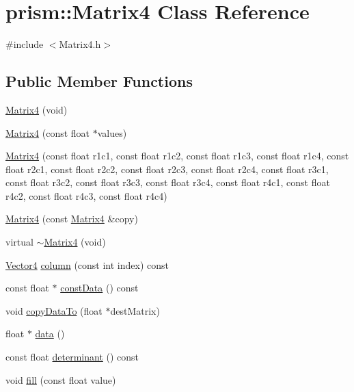 \hypertarget{classprism_1_1_matrix4}{}\section{prism\+:\+:Matrix4 Class Reference}
\label{classprism_1_1_matrix4}


{\ttfamily \#include $<$Matrix4.\+h$>$}

\subsection*{Public Member Functions}
\begin{DoxyCompactItemize}
\item 
\hyperlink{classprism_1_1_matrix4_a9db27bce505b827ee46568fb105ff563}{Matrix4} (void)
\item 
\hyperlink{classprism_1_1_matrix4_a442f58d6a24413f1e2cb7cf6150c5fb9}{Matrix4} (const float $\ast$values)
\item 
\hyperlink{classprism_1_1_matrix4_a6e19410eb6de5dfdaeb989d3042176a1}{Matrix4} (const float r1c1, const float r1c2, const float r1c3, const float r1c4, const float r2c1, const float r2c2, const float r2c3, const float r2c4, const float r3c1, const float r3c2, const float r3c3, const float r3c4, const float r4c1, const float r4c2, const float r4c3, const float r4c4)
\item 
\hyperlink{classprism_1_1_matrix4_a1112c0939a2dc4112d0552cafd37dff0}{Matrix4} (const \hyperlink{classprism_1_1_matrix4}{Matrix4} \&copy)
\item 
virtual \hyperlink{classprism_1_1_matrix4_aa2117a89fa9caa8dc2b412edca5e0dd5}{$\sim$\+Matrix4} (void)
\item 
\hyperlink{classprism_1_1_vector4}{Vector4} \hyperlink{classprism_1_1_matrix4_ab7eaeaa15cc37f55e745ea864965e7ab}{column} (const int index) const 
\item 
const float $\ast$ \hyperlink{classprism_1_1_matrix4_a69244d86a13dce29f8f0a55f236b38fb}{const\+Data} () const 
\item 
void \hyperlink{classprism_1_1_matrix4_a03e5bcf5cf9a158588c375ed2e926cfd}{copy\+Data\+To} (float $\ast$dest\+Matrix)
\item 
float $\ast$ \hyperlink{classprism_1_1_matrix4_a44d98ab79e84733585994391561e2bec}{data} ()
\item 
const float \hyperlink{classprism_1_1_matrix4_adafd95c93e903c7d5971c860257e0921}{determinant} () const 
\item 
void \hyperlink{classprism_1_1_matrix4_a250d014842d71975bdfe34443703d090}{fill} (const float value)

\end{DoxyCompactItemize}
